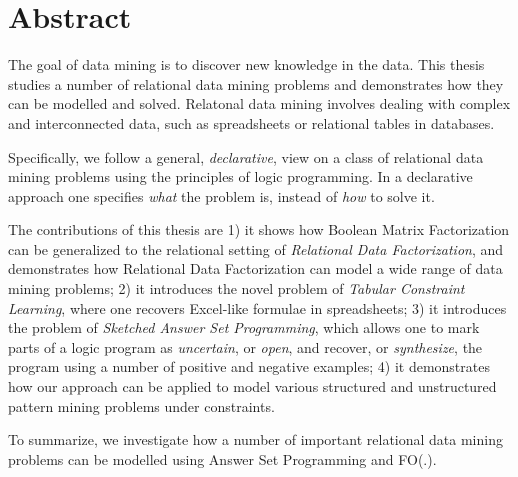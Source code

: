 \chapter{Abstract} \label{ch:abstract}
The goal of data mining is to discover new knowledge in the data. This
thesis studies a number of relational data mining problems and
demonstrates how they can be modelled and solved. Relatonal data
mining involves dealing with complex and interconnected data, such as
spreadsheets or relational tables in databases. 

Specifically, we follow a general, \textit{declarative}, view on a
class of relational data mining problems using the principles of logic
programming. In a declarative approach one specifies \textit{what} the
problem is, instead of \textit{how} to solve it. 

The contributions of this thesis are 1) it shows how Boolean Matrix Factorization can be generalized to the
relational setting of \textit{Relational Data Factorization}, and 
demonstrates how Relational Data Factorization can model a wide range
of data mining problems; 2) it introduces the novel
problem of \textit{Tabular Constraint Learning}, where one recovers
Excel-like formulae in spreadsheets; 3) it introduces the problem of \textit{Sketched Answer Set
Programming}, which allows one to mark parts of a logic program as
\textit{uncertain}, or \textit{open}, and recover, or
\textit{synthesize}, the program using a number of positive and
negative examples; 4) it demonstrates how our approach can be
applied to model various structured and unstructured pattern mining
problems under constraints.

\pubrev
To summarize, we investigate how a number of important relational data
mining problems can be modelled using Answer Set Programming and FO(.). 
\pubrevend

\cleardoublepage

